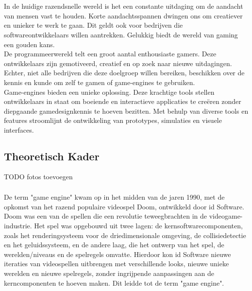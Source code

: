 \chapter{}%
\label{ch:stand-van-zaken}

In de huidige razendsnelle wereld is het een constante uitdaging om de aandacht van mensen vast te houden. Korte aandachtsspannen dwingen ons om creatiever en unieker te werk te gaan. Dit geldt ook voor bedrijven die softwareontwikkelaars willen aantrekken. Gelukkig biedt de wereld van gaming een gouden kans.
\\
De programmeerwereld telt een groot aantal enthousiaste gamers. Deze ontwikkelaars zijn gemotiveerd, creatief en op zoek naar nieuwe uitdagingen. Echter, niet alle bedrijven die deze doelgroep willen bereiken, beschikken over de kennis en kunde om zelf te gamen of game-engines te gebruiken.
\\
Game-engines bieden een unieke oplossing. Deze krachtige tools stellen ontwikkelaars in staat om boeiende en interactieve applicaties te creëren zonder diepgaande gamedesignkennis te hoeven bezitten. Met behulp van diverse tools en features stroomlijnt de ontwikkeling van prototypes, simulaties en visuele interfaces.

\section{Theoretisch Kader}
TODO fotos toevoegen
\subsection{}%
\label{sec:game-engines}
De term "game engine" kwam op in het midden van de jaren 1990, met de opkomst van het razend populaire videospel Doom, ontwikkeld door id Software. Doom was een van de spellen die een revolutie teweegbrachten in de videogame-industrie. Het spel was opgebouwd uit twee lagen: de kernsoftwarecomponenten, zoals het renderingsysteem voor de driedimensionale omgeving, de collisiedetectie en het geluidssysteem, en de andere laag, die het ontwerp van het spel, de werelden/niveaus en de spelregels omvatte. Hierdoor kon id Software nieuwe iteraties van videospellen uitbrengen met verschillende looks, nieuwe unieke werelden en nieuwe spelregels, zonder ingrijpende aanpassingen aan de kerncomponenten te hoeven maken. Dit leidde tot de term "game engine". \cite{gregory2018game}

